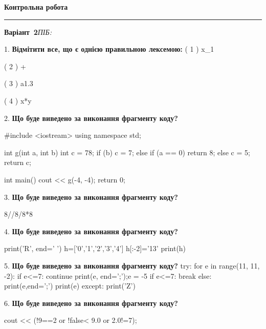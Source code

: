 \documentclass[11pt]{article}
\begin{document}
{\centering\Large\bfseries Контрольна робота\par}
\medskip
\noindent\rule{\linewidth}{0.5pt}
\smallskip
\noindent\textbf{Варіант \No\,2}\hfill \textit{ПІБ:}\,\underline{\hspace{60mm}}
\vspace{4mm}

1. %
\textbf{Відмітити все, що є однією правильною лексемою:}
( 1 ) x_1

( 2 ) +

( 3 ) a1.3

( 4 ) x*y
\par\vspace{5mm}

2. \textbf{Що буде виведено за виконання фрагменту коду?}

#include <iostream>
using namespace std;

int g(int a, int b){
    int c = 78;
    if (b)
        c = 7;
    else if (a == 0)
         return 8;
    else 
        c = 5;
    return c;
}

int main(){
    cout << g(-4, -4);
    return 0;
}
\par\vspace{5mm}

3. \textbf{Що буде виведено за виконання фрагменту коду?}

8//8/8*8
\par\vspace{5mm}

4. \textbf{Що буде виведено за виконання фрагменту коду?}

print('R', end=' ')
h=['0','1','2','3','4']
h[:-2]='13'
print(h)

\par\vspace{5mm}

5. \textbf{Що буде виведено за виконання фрагменту коду?}
try:
    for e in range(11, 11, -2):
        if e<=7:
            continue
        print(e, end=';');e = -5
        if e<=7:
            break
    else:
        print(e,end=';')
    print(e)
except:
    print('Z')
\par\vspace{5mm}

6. \textbf{Що буде виведено за виконання фрагменту коду?}

cout << (!9==2 or !false< 9.0 or 2.0!=7);
\par\vspace{5mm}
\end{document}
